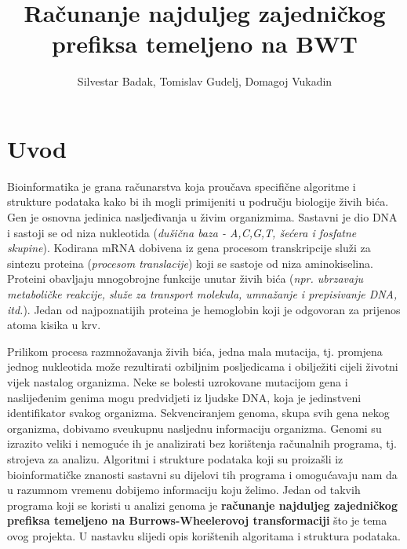 \documentclass[times, utf8, seminar, numeric]{fer}
\begin{document}
\nocite{*}

\title{Računanje najduljeg zajedničkog prefiksa temeljeno na BWT}

\author{Silvestar Badak, Tomislav Gudelj, Domagoj Vukadin}


\maketitle

\tableofcontents

\chapter{Uvod}
Bioinformatika je grana računarstva koja proučava specifične algoritme i strukture podataka kako bi ih mogli primijeniti u području biologije živih bića. Gen je osnovna jedinica nasljeđivanja u živim organizmima. Sastavni je dio DNA i sastoji se od niza nukleotida (\textit{dušična baza - A,C,G,T, šećera i fosfatne skupine}). Kodirana mRNA dobivena iz gena procesom transkripcije služi za sintezu proteina (\textit{procesom translacije}) koji se sastoje od niza aminokiselina. Proteini obavljaju mnogobrojne funkcije unutar živih bića (\textit{npr. ubrzavaju metaboličke reakcije, služe za transport molekula, umnažanje i prepisivanje DNA, itd.}). Jedan od najpoznatijih proteina je hemoglobin koji je odgovoran za prijenos atoma kisika u krv.\cite{domazet_sikic_skripta} \\
\par Prilikom procesa razmnožavanja živih bića, jedna mala mutacija, tj. promjena jednog nukleotida može rezultirati ozbiljnim posljedicama i obilježiti cijeli životni vijek nastalog organizma. Neke se bolesti uzrokovane mutacijom gena i naslijeđenim genima mogu predvidjeti iz ljudske DNA, koja je jedinstveni identifikator svakog organizma. Sekvenciranjem genoma, skupa svih gena nekog organizma, dobivamo sveukupnu nasljednu informaciju organizma. Genomi su izrazito veliki i nemoguće ih je analizirati bez korištenja računalnih programa, tj. strojeva za analizu. Algoritmi i strukture podataka koji su proizašli iz bioinformatičke znanosti sastavni su dijelovi tih programa i omogućavaju nam da u razumnom vremenu dobijemo informaciju koju želimo. Jedan od takvih programa koji se koristi u analizi genoma je \textbf{računanje najduljeg zajedničkog prefiksa temeljeno na Burrows-Wheelerovoj transformaciji} što je tema ovog projekta. U nastavku slijedi opis korištenih algoritama i struktura podataka.
\end{document}
